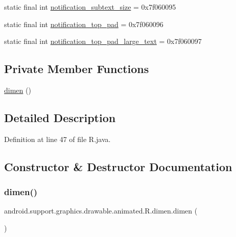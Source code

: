 \begin{DoxyCompactItemize}
static final int \mbox{\hyperlink{classandroid_1_1support_1_1graphics_1_1drawable_1_1animated_1_1_r_1_1dimen_a40416a33b35489d562caad41d12c3fc6}{notification\+\_\+subtext\+\_\+size}} = 0x7f060095
\item 
static final int \mbox{\hyperlink{classandroid_1_1support_1_1graphics_1_1drawable_1_1animated_1_1_r_1_1dimen_a68f0cd81cc977c680d070c3a2d526633}{notification\+\_\+top\+\_\+pad}} = 0x7f060096
\item 
static final int \mbox{\hyperlink{classandroid_1_1support_1_1graphics_1_1drawable_1_1animated_1_1_r_1_1dimen_ac1259038d37ccbdd21639a3803611c92}{notification\+\_\+top\+\_\+pad\+\_\+large\+\_\+text}} = 0x7f060097
\end{DoxyCompactItemize}
\subsection*{Private Member Functions}
\begin{DoxyCompactItemize}
\item 
\mbox{\hyperlink{classandroid_1_1support_1_1graphics_1_1drawable_1_1animated_1_1_r_1_1dimen_ab162ff0f0df31e8e48e0f923a7e858cb}{dimen}} ()
\end{DoxyCompactItemize}


\subsection{Detailed Description}


Definition at line 47 of file R.\+java.



\subsection{Constructor \& Destructor Documentation}
\mbox{\label{classandroid_1_1support_1_1graphics_1_1drawable_1_1animated_1_1_r_1_1dimen_ab162ff0f0df31e8e48e0f923a7e858cb}} 
\subsubsection{\texorpdfstring{dimen()}{dimen()}}
{\footnotesize\ttfamily android.\+support.\+graphics.\+drawable.\+animated.\+R.\+dimen.\+dimen (\begin{DoxyParamCaption}{ }\end{DoxyParamCaption})\hspace{0.3cm}{\ttfamily [private]}}



